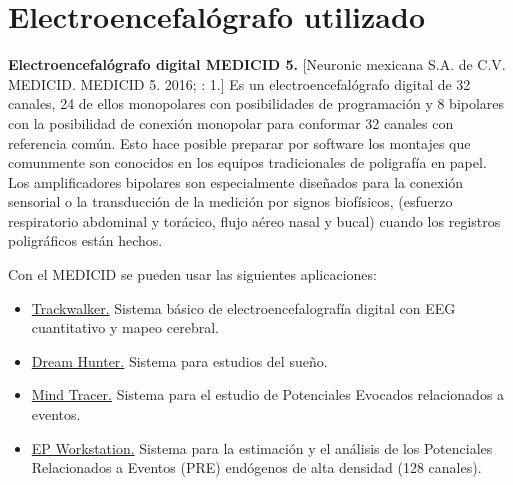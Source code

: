 
\section{Electroencefal\'ografo utilizado}

\textbf{Electroencefal\'ografo digital MEDICID 5.} 
[Neuronic mexicana S.A. de C.V. MEDICID. MEDICID 5. 2016; : 1.]
Es un electroencefal\'ografo digital de 32 canales, 24 de ellos monopolares con posibilidades de 
programaci\'on y 8 bipolares con la posibilidad de conexi\'on monopolar para conformar 32 canales 
con referencia com\'un. Esto hace posible preparar por software los montajes que comunmente son 
conocidos en los equipos tradicionales de poligraf\'ia en papel. Los amplificadores bipolares son 
especialmente dise\~nados para la conexi\'on sensorial o la transducci\'on de la medici\'on por 
signos biof\'isicos, (esfuerzo respiratorio abdominal y tor\'acico, flujo a\'ereo nasal y bucal) 
cuando los registros poligr\'aficos est\'an hechos. 

Con el MEDICID se pueden usar las siguientes aplicaciones: 
\begin{itemize}
\item \underline{Trackwalker.} Sistema b\'asico de electroencefalograf\'ia digital con EEG 
cuantitativo y mapeo cerebral.

\item \underline{Dream Hunter.} Sistema para estudios del sue\~no.

\item \underline{Mind Tracer.} Sistema para el estudio de Potenciales Evocados 
relacionados a eventos.

\item \underline{EP Workstation.} Sistema para la estimaci\'on y el an\'alisis de los 
Potenciales Relacionados a Eventos (PRE) end\'ogenos de alta densidad (128 canales). 
\end{itemize}

